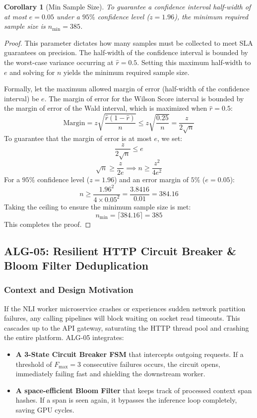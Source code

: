 \documentclass[11pt,a4paper]{article}
\theoremstyle{plain}
\newtheorem{corollary}[theorem]{Corollary}
\theoremstyle{definition}
\theoremstyle{remark}
\begin{document}
\begin{corollary}[Min Sample Size]\label{cor:n}
To guarantee a confidence interval half-width of at most $e = 0.05$ under a $95\%$ confidence level ($z=1.96$), the minimum required sample size is $n_{\min} = 385$.
\end{corollary}
\begin{proof}
This parameter dictates how many samples must be collected to meet SLA guarantees on precision. The half-width of the confidence interval is bounded by the worst-case variance occurring at $\hat{r}=0.5$. Setting this maximum half-width to $e$ and solving for $n$ yields the minimum required sample size.

Formally, let the maximum allowed margin of error (half-width of the confidence interval) be $e$. The margin of error for the Wilson Score interval is bounded by the margin of error of the Wald interval, which is maximized when $\hat{r} = 0.5$:
$$\text{Margin} = z \sqrt{\frac{\hat{r}(1-\hat{r})}{n}} \le z \sqrt{\frac{0.25}{n}} = \frac{z}{2\sqrt{n}}$$
To guarantee that the margin of error is at most $e$, we set:
$$\frac{z}{2\sqrt{n}} \le e$$
$$\sqrt{n} \ge \frac{z}{2e} \implies n \ge \frac{z^2}{4e^2}$$
For a $95\%$ confidence level ($z = 1.96$) and an error margin of $5\%$ ($e = 0.05$):
$$n \ge \frac{1.96^2}{4 \times 0.05^2} = \frac{3.8416}{0.01} = 384.16$$
Taking the ceiling to ensure the minimum sample size is met:
$$n_{\min} = \lceil 384.16 \rceil = 385$$
This completes the proof.
\end{proof}

\subsection{ALG-05: Resilient HTTP Circuit Breaker \& Bloom Filter Deduplication}
\label{subsec:alg05}

\subsubsection{Context and Design Motivation}
If the NLI worker microservice crashes or experiences sudden network partition failures, any calling pipelines will block waiting on socket read timeouts. This cascades up to the API gateway, saturating the HTTP thread pool and crashing the entire platform. ALG-05 integrates:
\begin{itemize}[nosep]
  \item \textbf{A 3-State Circuit Breaker FSM} that intercepts outgoing requests. If a threshold of $F_{\max}=3$ consecutive failures occurs, the circuit opens, immediately failing fast and shielding the downstream worker.
  \item \textbf{A space-efficient Bloom Filter} that keeps track of processed context span hashes. If a span is seen again, it bypasses the inference loop completely, saving GPU cycles.
\end{itemize}
\end{document}
